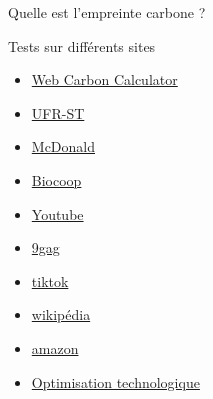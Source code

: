 \documentclass[10pt,xcolor={dvipsnames}]{beamer}
\begin{document}
\begin{frame}{Quelle est l'empreinte carbone ? }

\begin{block}{Tests sur différents sites}

\begin{minipage}[b]{0.5\linewidth}
\begin{itemize}
\item \href{https://www.websitecarbon.com/}{Web Carbon Calculator}
\item \href{https://www.websitecarbon.com/website/univ-fcomte-fr/}{UFR-ST}
\item \href{https://www.websitecarbon.com/website/mcdonalds-fr/}{McDonald}
\item \href{https://www.websitecarbon.com/website/biocoop-fr-gclidcj0kcqia-eembhcparisaazfxzcs3nwxf-5givohpm1_79vyloxmb8cff4vai8q_0ymev_jfyixcyoaaav51ealw_wcb/}{Biocoop}
\item \href{https://www.websitecarbon.com/website/youtube-com/}{Youtube}
\item \href{https://www.websitecarbon.com/website/9gag-com/}{9gag}
\item \href{https://www.websitecarbon.com/website/tiktok-com-fr/}{tiktok}
\item \href{https://www.websitecarbon.com/website/wikipedia-org/}{wikipédia}
\item \href{https://www.websitecarbon.com/website/amazon-fr/}{amazon}

\item \href{https://www.red-inc.com/}{Optimisation technologique}

\end{itemize}


\end{minipage}
\end{block}
\end{frame}
\end{document}
